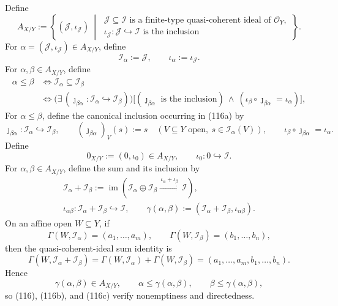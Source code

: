 \begin{definition}
\[  \]
  Define
  \[
    A_{X/Y}:=\left\{(\mathcal J,\iota_{\mathcal J})\ \middle|\
      \begin{array}{l}
        \mathcal J\subseteq\mathcal I\text{ is a finite-type
          quasi-coherent ideal of }\mathcal O_Y,\\
        \iota_{\mathcal J}\colon\mathcal J\hookrightarrow\mathcal I
          \text{ is the inclusion}
      \end{array}\right\}.                                      \tag{116}
  \]
  For
  $\alpha=(\mathcal J,\iota_{\mathcal J})\in A_{X/Y}$, define
  \[
    \mathcal I_\alpha:=\mathcal J,
    \qquad
    \iota_\alpha:=\iota_{\mathcal J}.
  \]
  For $\alpha,\beta\in A_{X/Y}$, define
  \[
  \begin{aligned}
    \alpha\leq\beta
    &\Longleftrightarrow \mathcal I_\alpha\subseteq\mathcal I_\beta\\
    &\Longleftrightarrow
      \bigl(\exists\,(\jmath_{\beta\alpha}\colon
        \mathcal I_\alpha\hookrightarrow\mathcal I_\beta)\bigr)
      \bigl[
        (\jmath_{\beta\alpha}\text{ is the inclusion})
        \ \wedge\
        (\iota_\beta\circ\jmath_{\beta\alpha}=\iota_\alpha)
      \bigr],
  \end{aligned}                                                   \tag{116a}
  \]
  For $\alpha\leq\beta$, define the canonical inclusion occurring in
  (116a) by
  \[
    \jmath_{\beta\alpha}\colon
      \mathcal I_\alpha\hookrightarrow\mathcal I_\beta,
    \qquad
    (\jmath_{\beta\alpha})_V(s):=s
      \quad(V\subseteq Y\text{ open},\
        s\in\mathcal I_\alpha(V)),
    \qquad
    \iota_\beta\circ\jmath_{\beta\alpha}=\iota_\alpha.
  \]
  Define
  \[
    0_{X/Y}:=(0,\iota_0)\in A_{X/Y},
    \qquad
    \iota_0\colon0\hookrightarrow\mathcal I.
  \]
  For $\alpha,\beta\in A_{X/Y}$, define the sum and its inclusion by
  \[
  \begin{gathered}
    \mathcal I_\alpha+\mathcal I_\beta
      :=\operatorname{im}\!\left(
        \mathcal I_\alpha\oplus\mathcal I_\beta
          \xrightarrow{\,\iota_\alpha+\iota_\beta\,}\mathcal I\right),\\
    \iota_{\alpha\beta}\colon
      \mathcal I_\alpha+\mathcal I_\beta\hookrightarrow\mathcal I,
    \qquad
    \gamma(\alpha,\beta):=
      (\mathcal I_\alpha+\mathcal I_\beta,
        \iota_{\alpha\beta}).                                  
  \end{gathered} \tag{116b}
  \]
  On an affine open $W\subseteq Y$, if
  \[
    \Gamma(W,\mathcal I_\alpha)=(a_1,\ldots,a_m),
    \qquad
    \Gamma(W,\mathcal I_\beta)=(b_1,\ldots,b_n),
  \]
  then the quasi-coherent-ideal sum identity is
  \[
    \Gamma(W,\mathcal I_\alpha+\mathcal I_\beta)
      =\Gamma(W,\mathcal I_\alpha)+\Gamma(W,\mathcal I_\beta)
      =(a_1,\ldots,a_m,b_1,\ldots,b_n).
  \]
  Hence
  \[
    \gamma(\alpha,\beta)\in A_{X/Y},
    \qquad
    \alpha\leq\gamma(\alpha,\beta),
    \qquad
    \beta\leq\gamma(\alpha,\beta),                            \tag{116c}
  \]
  so (116), (116b), and (116c) verify nonemptiness and directedness.


\end{definition}
